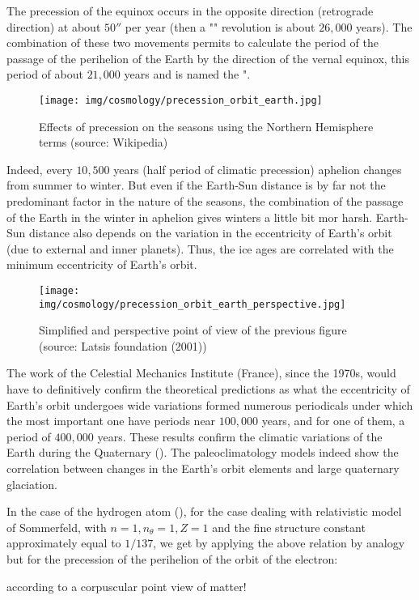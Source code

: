 	The precession of the equinox occurs in the opposite direction (retrograde direction) at about $50''$ per year (then a "" revolution is about $26,000$ years). The combination of these two movements permits to calculate the period of the passage of the perihelion of the Earth by the direction of the vernal equinox, this period of about $21,000$ years and is named the ".
	\begin{figure}[H]
		\begin{center}
		\texttt{[image: img/cosmology/precession\_orbit\_earth.jpg]}
		\end{center}	
		\caption[Effects of precession on the seasons using the Northern Hemisphere terms]{Effects of precession on the seasons using the Northern Hemisphere terms (source: Wikipedia)}
	\end{figure}
	Indeed, every $10,500$ years (half period of climatic precession) aphelion changes from summer to winter. But even if the Earth-Sun distance is by far not the predominant factor in the nature of the seasons, the combination of the passage of the Earth in the winter in aphelion gives winters a little bit mor harsh. Earth-Sun distance also depends on the variation in the eccentricity of Earth's orbit (due to external and inner planets). Thus, the ice ages are correlated with the minimum eccentricity of Earth's orbit.
	\begin{figure}[H]
		\begin{center}
		\texttt{[image: img/cosmology/precession\_orbit\_earth\_perspective.jpg]}
		\end{center}	
		\caption[]{Simplified and perspective point of view of the previous figure (source: Latsis foundation (2001))}
	\end{figure}
	The work of the Celestial Mechanics Institute (France), since the 1970s, would have to definitively confirm the theoretical predictions as what the eccentricity of Earth's orbit undergoes wide variations formed numerous periodicals under which the most important one have periods near $100,000$ years, and for one of them, a period of $400,000$ years. These results confirm the climatic variations of the Earth during the Quaternary (). The paleoclimatology models indeed show the correlation between changes in the Earth's orbit elements and large quaternary glaciation.
	\begin{tcolorbox}[title=Remark,colframe=black,arc=10pt]
	In the case of the hydrogen atom (), for the case dealing with relativistic model of Sommerfeld, with $n=1,n_\theta=1,Z=1$ and the fine structure constant approximately equal to $1/137$, we get by applying the above relation by analogy but for the precession of the perihelion of the orbit of the electron:
	
	according to a corpuscular point view of matter!
	\end{tcolorbox}
	
